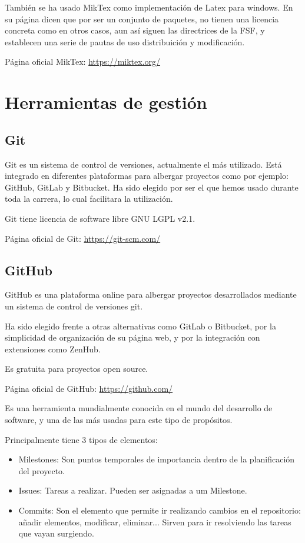 También se ha usado MikTex como implementación de Latex para windows. En su página dicen que por ser un conjunto de paquetes, no tienen una licencia concreta como en otros casos, aun así siguen las directrices de la FSF\cite{fsf}, y establecen una serie de pautas de uso distribuición y modificación.

Página oficial MikTex: \url{https://miktex.org/}

\section{Herramientas de gestión}

\subsection{Git}
Git es un sistema de control de versiones, actualmente el más utilizado. Está integrado en diferentes plataformas para albergar proyectos como por ejemplo: GitHub, GitLab y Bitbucket.
Ha sido elegido por ser el que hemos usado durante toda la carrera, lo cual facilitara la utilización.

Git tiene licencia de software libre GNU LGPL v2.1.

Página oficial de Git: \url{https://git-scm.com/}

\subsection{GitHub}
GitHub es una plataforma online para albergar proyectos desarrollados mediante un sistema de control de versiones git. 

Ha sido elegido frente a otras alternativas como GitLab o Bitbucket, por la simplicidad de organización de su página web, y por la integración con extensiones como ZenHub.

Es gratuita para proyectos open source.

Página oficial de GitHub: \url{https://github.com/}

Es una herramienta mundialmente conocida en el mundo del desarrollo de software, y una de las más usadas para este tipo de propósitos.

Principalmente tiene 3 tipos de elementos:
\begin{itemize}
	\item Milestones: Son puntos temporales de importancia dentro de la planificación del proyecto.
	\item Issues: Tareas a realizar. Pueden ser asignadas a um Milestone. 
 	\item Commits: Son el elemento que permite ir realizando cambios en el repositorio: añadir elementos, modificar, eliminar... Sirven para ir resolviendo las tareas que vayan surgiendo.
\end{itemize}

